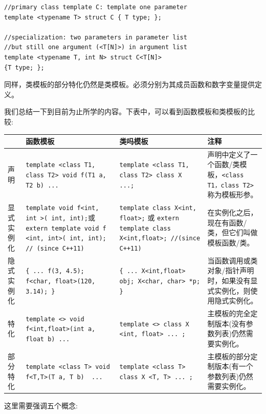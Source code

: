 \begin{lstlisting}[caption={}]
//primary class template C: template one parameter
template <typename T> struct C { T type; };

//specialization: two parameters in parameter list
//but still one argument (<T[N]>) in argument list
template <typename T, int N> struct C<T[N]>
{T type; };
\end{lstlisting}

同样，类模板的部分特化仍然是类模板。必须分别为其成员函数和数字变量提供定义。\par
我们总结一下到目前为止所学的内容。下表中，可以看到函数模板和类模板的比较:\par


\begin{table}[h]
	\begin{tabularx}{\textwidth}{|p{2cm}|X|X|X|}
		\hline
		& 函数模板  & 类吗模板  & 注释 \\ 
		\hline
		声明	& \texttt{template <class T1, class T2> void f(T1 a, T2 b){ ... }} & \texttt{template <class T1, class T2> class X { ...};} & 声明中定义了一个函数/类模板，\texttt{<class T1，class T2>}称为模板形参。 \\
		\hline
		显式实例化 & \texttt{template void f<int, int >( int, int);}或 \texttt{extern template	void f <int, int>( int, int); // (since C++11)} & \texttt{template class X<int, float>;} 或 \texttt{extern template	class X<int,float>; //(since C++11)} & 在实例化之后，现在有函数/类，但它们叫做模板函数/类。 \\
		\hline
		隐式实例化	& \texttt{\{
			... 
			f(3, 4.5);
			f<char,
			float>(120, 3.14);
		\}} & \texttt{\{
			... 
			X<int,float> obj; 
			X<char, char> *p;
		\}} & 当函数调用或类对象/指针声明时，如果没有显式实例化，则使用隐式实例化。 \\
		\hline
		特化	& \texttt{template <> void f<int,float>(int a, float b){ ... }} & \texttt{template <> class X <int, float>{ ... };} & 主模板的完全定制版本(没有参数列表)仍然需要实例化。 \\
		\hline
		部分特化	& \texttt{template <class T> void f<T,T>(T a, T b) { ... }} & \texttt{template <class T> class X <T, T>{	... };} & 主模板的部分定制版本(有一个参数列表)仍然需要实例化。 \\ 
		\hline
	\end{tabularx}
\end{table}

这里需要强调五个概念: \par

